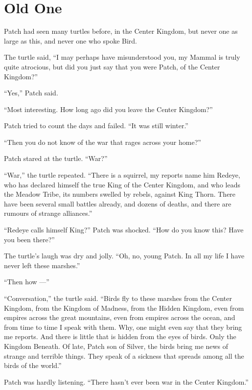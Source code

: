 \documentclass[ebook,oneside,openany,17pt]{memoir}
\newenvironment{tolerant}[1]{%
  \par\tolerance=#1\relax
}{%
  \par
}
\renewcommand{\thechapter}{\Roman{chapter}}
\newcounter{sections}
\newcommand{\sections}[1]{%
  \section*{#1}
  \addtocounter{sections}{1}%
  \pdfbookmark[1]{#1}{section.\thechapter.\thesections}}
\begin{document}

\sections{Old One}

Patch had seen many turtles before, in the Center Kingdom, but never
one as large as this, and never one who spoke Bird.

The turtle said, “I may perhaps have misunderstood you, my Mammal is
truly quite atrocious, but did you just say that you were Patch, of
the Center Kingdom?”

“Yes,” Patch said.

“Most interesting. How long ago did you leave the Center Kingdom?”

Patch tried to count the days and failed. “It was still winter.”

“Then you do not know of the war that rages across your home?”

Patch stared at the turtle. “War?”

\begin{tolerant}{1000}
“War,” the turtle repeated. “There is a squirrel, my reports name him
Redeye, who has declared himself the true King of the Center Kingdom,
and who leads the Meadow Tribe, its numbers swelled by rebels, against
King Thorn. There have been several small battles already, and dozens
of deaths, and there are rumours of strange alliances.”
\end{tolerant}

“Redeye calls himself King?” Patch was shocked. “How do you know this?
Have you been there?”

\begin{tolerant}{1000}
The turtle’s laugh was dry and jolly. “Oh, no, young Patch. In all my
life I have never left these marshes.”
\end{tolerant}

“Then how —”

“Conversation,” the turtle said. “Birds fly to these marshes from the
Center Kingdom, from the Kingdom of Madness, from the Hidden Kingdom,
even from empires across the great mountains, even from empires across
the ocean, and from time to time I speak with them. Why, one might
even say that they bring me reports. And there is little that is
hidden from the eyes of birds. Only the Kingdom Beneath. Of late,
Patch son of Silver, the birds bring me news of strange and terrible
things. They speak of a sickness that spreads among all the birds of
the world.”

\begin{tolerant}{1000}
Patch was hardly listening. “There hasn’t ever been war in the Center
Kingdom.”
\end{tolerant}
\end{document}
